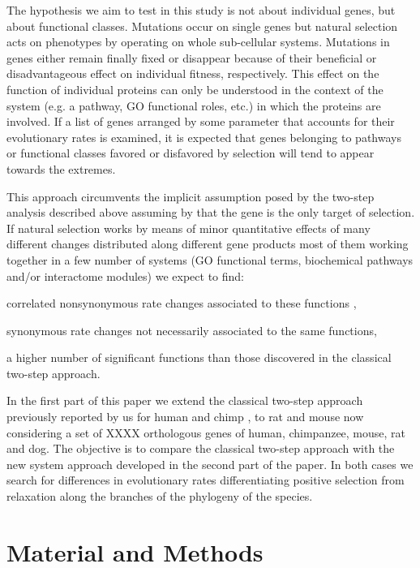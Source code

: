 The hypothesis we aim to test in this study is not about individual genes, but about functional classes. Mutations occur on single genes but natural selection acts on phenotypes by operating on whole sub-cellular systems. Mutations in genes either remain finally fixed or disappear because of their beneficial or disadvantageous effect on individual fitness, respectively. This effect on the function of individual proteins can only be understood in the context of the system (e.g. a pathway, GO functional roles, etc.) in which the proteins are involved. If a list of genes arranged by some parameter that accounts for their evolutionary rates is examined, it is expected that genes belonging to pathways or functional classes favored or disfavored by selection will tend to appear towards the extremes.

This approach circumvents the implicit assumption posed by the two-step analysis described above assuming by that the gene is the only target of selection. If natural selection works by means of minor quantitative effects of many different changes distributed along different gene products most of them working together in a few number of systems (GO functional terms, biochemical pathways and/or interactome modules) we expect to find: \begin{inparaenum}[ 1-] \item correlated nonsynonymous rate changes associated to these functions , \item synonymous rate changes not necessarily associated to the same functions, \item a higher number of significant functions than those discovered in the classical two-step approach.\end{inparaenum}

In the first part of this paper we extend the classical two-step approach previously reported by us for human and chimp \cite{Arbiza2006}, to rat and mouse now considering a set of XXXX orthologous genes of human, chimpanzee, mouse, rat and dog. The objective is to compare the classical two-step approach with the new system approach developed in the second part of the paper. In both cases we search for differences in evolutionary rates differentiating positive selection from relaxation along the branches of the phylogeny of the species.

\section{Material and Methods}

